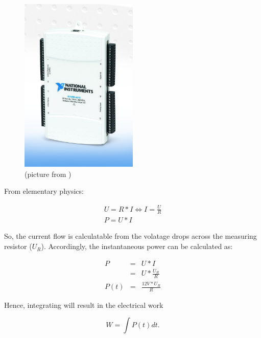 \begin{figure}
  \centering
    \includegraphics[width=0.5\textwidth]{fig/NI-USB-6218.jpg}
  \caption{\JWPni{} (picture from )}
  \label{fig:ni}
\end{figure}


\label{sec:calc-work}

From elementary physics:

\begin{eqnarray}
     U = R * I \iff I = \frac{U}{R} \\
     P = U * I
\end{eqnarray}

So, the current flow is calculatable from the volatage drops across the
measuring resistor ($U_R$). Accordingly, the instantaneous power can be
calculated as:

\begin{eqnarray}
P    & = & U * I \\
     & = & U * \frac{U_R}{R} \\
P(t) & = & \frac{12V * U_R}{R}
\end{eqnarray}

Hence, integrating will result in the electrical work

\begin{equation}
  W = \int P(t)dt.
\end{equation}


\label{sec:model}

